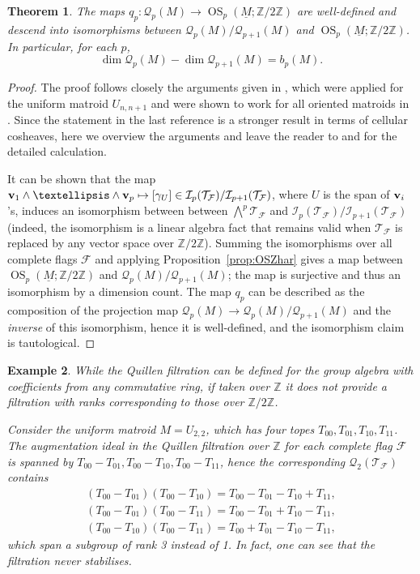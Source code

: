 \documentclass{amsart}
\newtheorem{theorem}{Theorem}[section]
\newtheorem{example}[theorem]{Example}
\newcommand\Fcal{{\mathcal F}}
\newcommand\Ical{{\mathcal I}}
\newcommand\Qcal{{\mathcal Q}}
\newcommand\Tcal{{\mathcal T}}
\newcommand\vv{{\bf v}}
\newcommand\ZZ{{\mathbb Z}}
\newcommand\Ztwo{{\mathbb Z}/2{\mathbb Z}}
\newcommand\qbv{{q}}
\DeclareMathOperator{\OS}{OS}
\begin{document}
{\begin{theorem} \label{thm:sign_cosheaf_dim}
The maps ${\qbv}_p \colon \Qcal_p(M) \to \OS_p(\underline{M}; \Ztwo)$
are well-defined and descend into isomorphisms between $\Qcal_p(M)/\Qcal_{p+1}(M)$ and $\OS_p(\underline{M};\Ztwo)$.
In particular, for each $p$, \[\dim\Qcal_p(M) - \dim\Qcal_{p+1}(M)= b_p(M).\]
\end{theorem}

\begin{proof}
The proof follows closely the arguments given in \cite[Proposition~4.3 and Lemma~4.8]{RS}, which were applied for the uniform matroid $U_{n, n+1}$ and were shown to work for all oriented matroids in \cite[Proposition 5.7]{RRS2}. 
Since the statement in the last reference is a stronger result in terms of cellular cosheaves, here we overview the arguments and leave the reader to \cite{RS} and \cite{RRS2} for the detailed calculation.

It can be shown that the map $\vv_1 \wedge \dots \wedge \vv_p\mapsto [\gamma_U]\in\Ical_p(\Tcal_\Fcal)/\Ical_{p+1}(\Tcal_\Fcal)$, where $U$ is the span of $\vv_i$'s, induces an isomorphism between between $\bigwedge^p\Tcal_\Fcal$ and $\Ical_p(\Tcal_\Fcal)/\Ical_{p+1}(\Tcal_\Fcal)$ (indeed, the isomorphism is a linear algebra fact that remains valid when $\Tcal_\Fcal$ is replaced by any vector space over $\Ztwo$).
Summing the isomorphisms over all complete flags $\Fcal$ and applying Proposition~\ref{prop:OSZhar} gives a map between $\OS_p(\underline{M};\Ztwo)$ and $\Qcal_p(M)/\Qcal_{p+1}(M)$; the map is surjective and thus an isomorphism by a dimension count.
The map $\qbv_p$ can be described as the composition of the projection map $\Qcal_p(M)\rightarrow\Qcal_p(M)/\Qcal_{p+1}(M)$ and the {\em inverse} of this isomorphism, hence it is well-defined, and the isomorphism claim is tautological.
\end{proof}

\begin{example} \label{ex:Quillen_no_Z} \rm
While the Quillen filtration can be defined for the group algebra with coefficients from any commutative ring, if taken over $\ZZ$ it does not provide a filtration with ranks corresponding to those over $\Ztwo$.

Consider the uniform matroid $M=U_{2,2}$, which has four topes $T_{00},T_{01},T_{10},T_{11}$.
The augmentation ideal in the Quillen filtration over $\ZZ$ for each complete flag $\Fcal$ is spanned by $T_{00}-T_{01},T_{00}-T_{10}, T_{00}-T_{11}$, hence the corresponding $\Qcal_2(\Tcal_\Fcal)$ contains
\begin{eqnarray*}
(T_{00}-T_{01})(T_{00}-T_{10})=T_{00}-T_{01}-T_{10}+T_{11},\\ 
(T_{00}-T_{01})(T_{00}-T_{11})=T_{00}-T_{01}+T_{10}-T_{11},\\
(T_{00}-T_{10})(T_{00}-T_{11})=T_{00}+T_{01}-T_{10}-T_{11},
\end{eqnarray*}
which span a subgroup of rank 3 instead of 1.
In fact, one can see that the filtration never stabilises.
\end{example}

}
\end{document}
